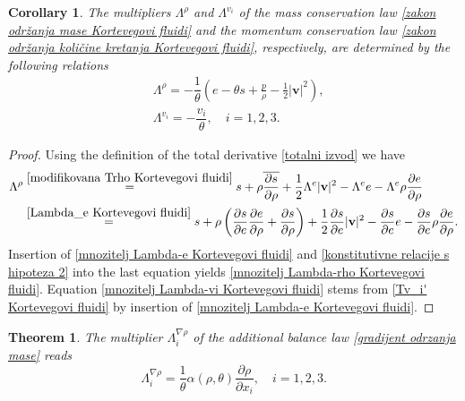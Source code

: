 \documentclass[a4paper,fleqn]{cas-sc}
\newtheorem{theorem}{Theorem}[section]
\newtheorem{corollary}{Corollary}[section]
\theoremstyle{definition}
\begin{document}
\begin{corollary}
	The multipliers $\Lambda^{\rho}$ and $\Lambda^{v_i}$ of the mass conservation law \eqref{zakon održanja mase Kortevegovi fluidi} and the momentum conservation law \eqref{zakon održanja količine kretanja Kortevegovi fluidi}, respectively, are determined by the following relations 
	\begin{align} 
		\label{mnozitelj Lambda-rho Kortevegovi fluidi}
		& \Lambda^{\rho} = - \dfrac{1}{\theta} \left( e - \theta s + \frac{p}{\rho} 
		- \frac{1}{2} |\mathbf{v}|^{2} \right), 
		\\
		\label{mnozitelj Lambda-vi Kortevegovi fluidi}
		& \Lambda^{v_i} = - \dfrac{v_{i}}{\theta}, \quad i = 1, 2, 3.
	\end{align}
\end{corollary}
\begin{proof}
	Using the definition of the total derivative \eqref{totalni izvod} we have
	\begin{align*}
		\Lambda^\rho &\overset{\eqref{modifikovana Trho Kortevegovi fluidi}}{=} s + \rho\overline{\dfrac{\partial s}{\partial\rho}} 
		+ \dfrac{1}{2}\Lambda^e|\mathbf{v}|^2 - \Lambda^ e e 
		- \Lambda^e \rho \dfrac{\partial e}{\partial\rho}
		\\
		&\overset{\eqref{Lambda_e Kortevegovi fluidi}}{=} s + \rho\left(\dfrac{\partial s}{\partial e}\dfrac{\partial e}{\partial\rho}+\dfrac{\partial s}{\partial\rho}\right)+\dfrac{1}{2}\dfrac{\partial s}{\partial e}|\mathbf{v}|^2 -\dfrac{\partial s}{\partial e} e - \dfrac{\partial s}{\partial e} \rho \dfrac{\partial e}{\partial\rho}.	   
	\end{align*}
	Insertion of \eqref{mnozitelj Lambda-e Kortevegovi fluidi} and \eqref{konstitutivne relacije s hipoteza 2} into the last equation yields \eqref{mnozitelj Lambda-rho Kortevegovi fluidi}. Equation \eqref{mnozitelj Lambda-vi Kortevegovi fluidi} stems from \eqref{Tv_i' Kortevegovi fluidi} by insertion of \eqref{mnozitelj Lambda-e Kortevegovi fluidi}. 
\end{proof}

\begin{theorem} \label{Te:Lambda-grad-rho}
	The multiplier $\Lambda^{\nabla\rho}_i$ of the additional balance law \eqref{gradijent odrzanja mase} reads
	\begin{equation} \label{mnozitelj Lambda-grad-rho Kortevegovi fluidi}
		\Lambda^{\nabla\rho}_i = \dfrac{1}{\theta} \alpha(\rho,\theta) 
		\dfrac{\partial \rho}{\partial x_i}, \quad i = 1, 2, 3. 
	\end{equation}
\end{theorem} 
\end{document}
